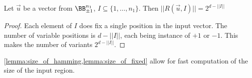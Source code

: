 \begin{lemma}{Let $\vec u$ be a vector from $\BB^{n_1}_{\pm 1}$, $I\subseteq \{1,\ldots,n_1\}$.
    Then $||R(\vec u, I)|| = 2^{d-||I||}$}%
    \label{lemma:size_of_fixed}%
    \begin{proof}
        Each element of $I$ does fix a single position in the input vector.
        The number of variable positions is $d-||I||$, each being instance of
        $+1$ or $-1$. This makes the number of variants $2^{d-||I||}$.
    \end{proof}
\end{lemma}

\begin{remark}
    \cref{lemma:size_of_hamming,lemma:size_of_fixed}
    allow for fast computation of the size of the input region.
\end{remark}

